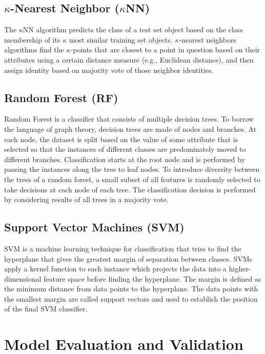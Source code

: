\subsection{$\kappa$-Nearest Neighbor ($\kappa$NN)}
The $\kappa$NN algorithm predicts the class of a test set object based on the class membership of its $\kappa$ most similar training set objects. \cite{Lapins2013} $\kappa$-nearest neighbors algorithms find the $\kappa$-points that are closest to a point in question based on their attributes using a certain distance measure (e.g., Euclidean distance), and then assign identity based on majority vote of those neighbor identities.

\subsection{Random Forest (RF)}
Random Forest is a classifier that consists of multiple decision trees. To borrow the language of graph theory, decision trees are made of nodes and branches. At each node, the dataset is split based on the value of some attribute that is selected so that the instances of different classes are predominately moved to different branches. Classification starts at the root node and is performed by passing the instances along the tree to leaf nodes. To introduce diversity between the trees of a random forest, a small subset of all features is randomly selected to take decisions at each node of each tree. The classification decision is performed by considering results of all trees in a majority vote. \cite{Lapins2013}

\subsection{Support Vector Machines (SVM)}
SVM is a machine learning technique for classification that tries to find the hyperplane that gives the greatest margin of separation between classes. SVMs apply a kernel function to each instance which projects the data into a higher-dimensional feature space before finding the hyperplane. \cite{Lapins2013} The margin is defined as the minimum distance from data points to the hyperplane. The data points with the smallest margin are called support vectors and used to establish the position of the final SVM classifier.

\section{Model Evaluation and Validation}

